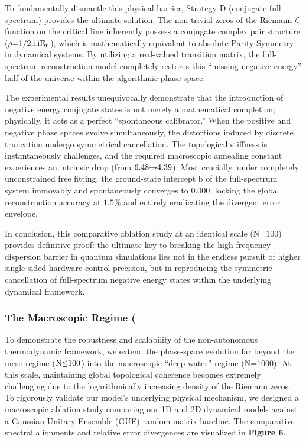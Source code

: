 \documentclass[fleqn,10pt]{wlscirep}
\begin{document}
To fundamentally dismantle this physical barrier, Strategy D (conjugate
full spectrum) provides the ultimate solution. The non-trivial zeros of
the Riemann \(\text{\ensuremath{\zeta}}\) function on the critical line inherently
possess a conjugate complex pair structure
(\(\text{\ensuremath{\rho}}\text{=1/2\ensuremath{\pm}}\text{i}\text{E}_{\text{n}}\)), which is
mathematically equivalent to absolute Parity Symmetry in dynamical
systems. By utilizing a real-valued transition matrix, the full-spectrum
reconstruction model completely restores this ``missing negative
energy'' half of the universe within the algorithmic phase space.

The experimental results unequivocally demonstrate that the introduction
of negative energy conjugate states is not merely a mathematical
completion; physically, it acts as a perfect ``spontaneous calibrator.''
When the positive and negative phase spaces evolve simultaneously, the
distortions induced by discrete truncation undergo symmetrical
cancellation. The topological stiffness is instantaneously challenges,
and the required macroscopic annealing constant experiences an intrinsic
drop (from \(\text{6.48\ensuremath{\rightarrow}4.39}\)). Most crucially, under completely
unconstrained free fitting, the ground-state intercept \(\text{b}\) of
the full-spectrum system immovably and spontaneously converges to
\(\text{0.000}\), locking the global reconstruction accuracy at
\(\text{1.5\%}\) and entirely eradicating the divergent error envelope.

In conclusion, this comparative ablation study at an identical scale
(\(\text{N}\text{=100}\)) provides definitive proof: the ultimate key to
breaking the high-frequency dispersion barrier in quantum simulations
lies not in the endless pursuit of higher single-sided hardware control
precision, but in reproducing the symmetric cancellation of
full-spectrum negative energy states within the underlying dynamical
framework.

\subsubsection*{The Macroscopic Regime (}

To demonstrate the robustness and scalability of the non-autonomous
thermodynamic framework, we extend the phase-space evolution far beyond
the meso-regime (\(\text{N}\text{\ensuremath{\le}100}\)) into the macroscopic
``deep-water'' regime (\(\text{N}\text{=1000}\)). At this scale,
maintaining global topological coherence becomes extremely challenging
due to the logarithmically increasing density of the Riemann zeros. To
rigorously validate our model's underlying physical mechanism, we
designed a macroscopic ablation study comparing our 1D and 2D dynamical
models against a Gaussian Unitary Ensemble (GUE) random matrix baseline.
The comparative spectral alignments and relative error divergences are
visualized in \textbf{Figure 6}.
\end{document}
